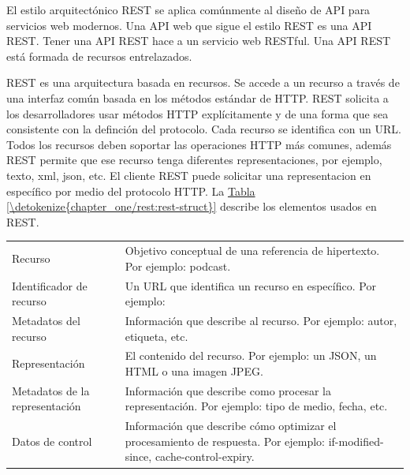 El estilo arquitectónico REST se aplica comúnmente al diseño de API para
servicios web modernos. Una API web que sigue el estilo REST es una API REST.
Tener una API REST hace a un servicio web RESTful. Una API REST está formada de
recursos entrelazados.

\begin{remark}
REST es una arquitectura basada en recursos. Se accede a un recurso a través
de una interfaz común basada en los métodos estándar de HTTP. REST
solicita a los desarrolladores usar métodos HTTP explícitamente
y de una forma que sea consistente con la definción del protocolo.
Cada recurso se identifica con un URL. Todos los recursos deben soportar
las operaciones HTTP más comunes, además REST permite que ese recurso
tenga diferentes representaciones, por ejemplo, texto, xml, json, etc.
El cliente REST puede solicitar una representacion en específico por
medio del protocolo HTTP. La \hyperref[\detokenize{chapter_one/rest:rest-struct}]{Tabla \ref{\detokenize{chapter_one/rest:rest-struct}}} describe
los elementos usados en REST.
\end{remark}


\begin{savenotes}\sphinxattablestart
\centering
{}
\label{\detokenize{chapter_one/rest:rest-struct}}
\sphinxaftercaption
\begin{tabulary}{\linewidth}[t]{|T|T|}
\hline
{}\relax &\relax \\
\hline
Recurso
&
Objetivo conceptual de una referencia de hipertexto. Por ejemplo: podcast.
\\
\hline
Identificador de recurso
&
Un URL que identifica un recurso en específico. Por ejemplo: 
\\
\hline
Metadatos del recurso
&
Información que describe al recurso. Por ejemplo: autor, etiqueta, etc.
\\
\hline
Representación
&
El contenido del recurso. Por ejemplo: un JSON, un HTML o una imagen JPEG.
\\
\hline
Metadatos de la representación
&
Información que describe como procesar la representación. Por ejemplo: tipo de medio, fecha, etc.
\\
\hline
Datos de control
&
Información que describe cómo optimizar el procesamiento de respuesta. Por ejemplo: if-modified-since, cache-control-expiry.
\\
\hline
\end{tabulary}
\par
\sphinxattableend\end{savenotes}

